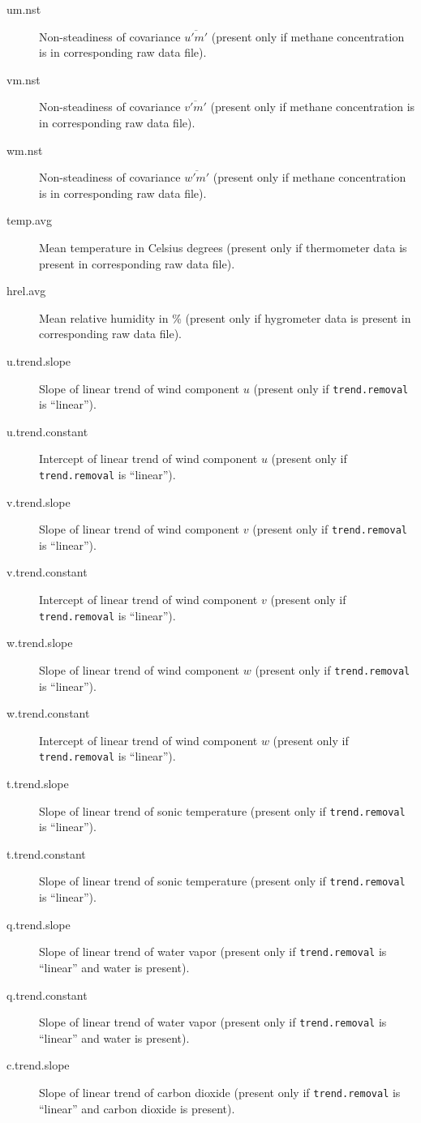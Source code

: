 \documentclass[a4paper,10pt]{book}
\begin{document}
\begin{description}
 \item[um.nst] Non-steadiness of covariance $\overline{u'm'}$ (present only if methane concentration is in corresponding raw data file).
 \item[vm.nst] Non-steadiness of covariance $\overline{v'm'}$ (present only if methane concentration is in corresponding raw data file).
 \item[wm.nst] Non-steadiness of covariance $\overline{w'm'}$ (present only if methane concentration is in corresponding raw data file).
 \item[temp.avg] Mean temperature in Celsius degrees (present only if thermometer data is present in corresponding raw data file).
 \item[hrel.avg] Mean relative humidity in \% (present only if hygrometer data is present in corresponding raw data file).
 \item[u.trend.slope] Slope of linear trend of wind component $u$ (present only if \verb|trend.removal| is ``linear'').
 \item[u.trend.constant] Intercept of linear trend of wind component $u$ (present only if \verb|trend.removal| is ``linear'').
 \item[v.trend.slope] Slope of linear trend of wind component $v$ (present only if \verb|trend.removal| is ``linear'').
 \item[v.trend.constant] Intercept of linear trend of wind component $v$ (present only if \verb|trend.removal| is ``linear'').
 \item[w.trend.slope] Slope of linear trend of wind component $w$ (present only if \verb|trend.removal| is ``linear'').
 \item[w.trend.constant] Intercept of linear trend of wind component $w$ (present only if \verb|trend.removal| is ``linear'').
 \item[t.trend.slope] Slope of linear trend of sonic temperature (present only if \verb|trend.removal| is ``linear'').
 \item[t.trend.constant] Slope of linear trend of sonic temperature (present only if \verb|trend.removal| is ``linear'').
 \item[q.trend.slope] Slope of linear trend of water vapor (present only if \verb|trend.removal| is ``linear'' and water is present).
 \item[q.trend.constant] Slope of linear trend of water vapor (present only if \verb|trend.removal| is ``linear'' and water is present).
 \item[c.trend.slope] Slope of linear trend of carbon dioxide (present only if \verb|trend.removal| is ``linear'' and carbon dioxide is present).

\end{description}
\end{document}
